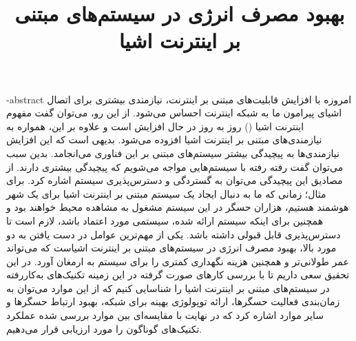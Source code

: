 \documentclass[oneside,openany,mscS]{SBU-Thesis}
\begin{document}
	\title{بهبود مصرف انرژی در سیستم‌های مبتنی بر اینترنت اشیا}
	
	\subject{مهندسی کامپیوتر}
	
	
	


	
	

	\fa-abstract{
امروزه با افزایش قابلیت‌های مبتنی بر اینترنت، نیازمندی بیشتری برای اتصال اشیای پیرامون ما به شبکه اینترنت احساس می‌شود. از این رو، می‌توان گفت مفهوم اینترنت اشیا () روز به روز در حال افزایش است و علاوه بر این، همواره به نیازمندی‌های مبتنی بر اینترنت اشیا افزوده می‌شود. بدیهی است که این افزایش نیازمندی‌ها به پیچیدگی بیشتر سیستم‌های مبتنی بر این فناوری می‌انجامد. بدین سبب می‌توان گفت رفته رفته با سیستم‌هایی مواجه می‌شویم که پیچیدگی بیشتری دارند. از مصادیق این پیچیدگی می‌توان به گستردگی و دسترس‌پذیری سیستم اشاره کرد. برای مثال؛ زمانی که ما به دنبال ایجاد یک سیستم مبتنی بر اینترنت اشیا برای یک شهر هوشمند هستیم، هزاران حسگر در این سیستم مشغول به مشاهده محیط خواهند بود و همچنین برای اینکه سیستم ارائه شده، سیستمی مورد اعتماد باشد، لازم است تا دسترس‌پذیری قابل قبولی داشته باشد. یکی از مهم‌ترین عوامل در دست یافتن به دو مورد بالا، بهبود مصرف انرژی در سیستم‌های مبتنی بر اینترنت اشیاست که می‌تواند عمر طولانی‌تر و همچنین هزینه نگهداری کمتری را برای سیستم به ارمغان آورد. در این تحقیق سعی داریم تا با بررسی کارهای صورت گرفته در این زمینه تکنیک‌های به‌کاررفته در سیستم‌های مبتنی بر اینترنت اشیا را شناسایی کنیم که از این موارد می‌توان به زمان‌بندی فعالیت حسگرها، ارائه توپولوژی بهینه برای شبکه، بهبود ارتباط حسگرها و سایر موارد اشاره کرد که در نهایت با مقایسه‌ای بین موارد بررسی شده عملکرد تکنیک‌های گوناگون را مورد ارزیابی قرار می‌دهیم. 
	}

\firstPage
\abstractPage %


\tableofcontents %




	
\newpage

\end{document}
